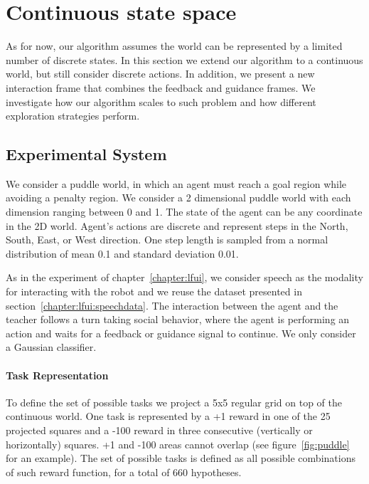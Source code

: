 \section{Continuous state space}
\label{chapter:limitations:continousstate}


As for now, our algorithm assumes the world can be represented by a limited number of discrete states. In this section we extend our algorithm to a continuous world, but still consider discrete actions. In addition, we present a new interaction frame that combines the feedback and guidance frames. We investigate how our algorithm scales to such problem and how different exploration strategies perform.

\subsection{Experimental System}

We consider a puddle world, in which an agent must reach a goal region while avoiding a penalty region. We consider a 2 dimensional puddle world with each dimension ranging between 0 and 1. The state of the agent can be any coordinate in the 2D world. Agent's actions are discrete and represent steps in the North, South, East, or West direction. One step length is sampled from a normal distribution of mean 0.1 and standard deviation 0.01.

As in the experiment of chapter~\ref{chapter:lfui}, we consider speech as the modality for interacting with the robot and we reuse the dataset presented in section~\ref{chapter:lfui:speechdata}. The interaction between the agent and the teacher follows a turn taking social behavior, where the agent is performing an action and waits for a feedback or guidance signal to continue. We only consider a Gaussian classifier.

\paragraph{Task Representation} 

To define the set of possible tasks we project a 5x5 regular grid on top of the continuous world. One task is represented by a +1 reward in one of the 25 projected squares and a -100 reward in three consecutive (vertically or horizontally) squares. +1 and -100 areas cannot overlap (see figure~\ref{fig:puddle} for an example). The set of possible tasks is defined as all possible combinations of such reward function, for a total of 660 hypotheses.

